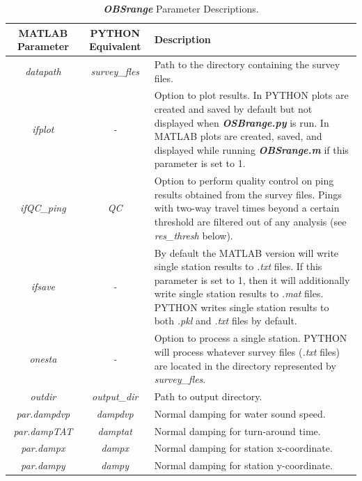\documentclass[titlepage, 12pt]{article}
\begin{document}
  \begin{table}[h!]
   \centering
   \caption{\textbf{\textit{OBSrange}} Parameter Descriptions.}
   \label{table:params}
   \footnotesize
   \begin{tabularx}{\linewidth}{|c|c|X|}
    \hline
    \textbf{MATLAB Parameter}   & \textbf{PYTHON Equivalent} & \textbf{Description} \\ \hline
    \textit{datapath}           & \textit{survey\_fles}      & Path to the directory containing the survey files.\\ \hline
    \textit{ifplot}             & \textit{-}                 & Option to plot results. In PYTHON plots are created and saved by default but not displayed when \textbf{\textit{OSBrange.py}} is run. In MATLAB plots are created, saved, and displayed while running \textbf{\textit{OBSrange.m}} if this parameter is set to 1.\\ \hline
    \textit{ifQC\_ping}         & \textit{QC}                & Option to perform quality control on ping results obtained from the survey files. Pings with two-way travel times beyond a certain threshold are filtered out of any analysis (see \textit{res\_thresh} below).\\ \hline
    \textit{ifsave}             & \textit{-}                 & By default the MATLAB version will write single station results to \textit{.txt} files. If this parameter is set to 1, then it will additionally write single station results to \textit{.mat} files. PYTHON writes single station results to both \textit{.pkl} and \textit{.txt} files by default.\\ \hline
    \textit{onesta}             & \textit{-}                 & Option to process a single station. PYTHON will process whatever survey files (\textit{.txt} files) are located in the directory represented by \textit{survey\_fles}.\\ \hline
    \textit{outdir}             & \textit{output\_dir}       & Path to output directory.\\ \hline
    \textit{par.dampdvp}        & \textit{dampdvp}           & Normal damping for water sound speed.\\ \hline
    \textit{par.dampTAT}        & \textit{damptat}           & Normal damping for turn-around time.\\ \hline
    \textit{par.dampx}          & \textit{dampx}             & Normal damping for station x-coordinate.\\ \hline
    \textit{par.dampy}          & \textit{dampy}             & Normal damping for station y-coordinate.\\ \hline

\end{tabularx}
\end{table}
\end{document}
